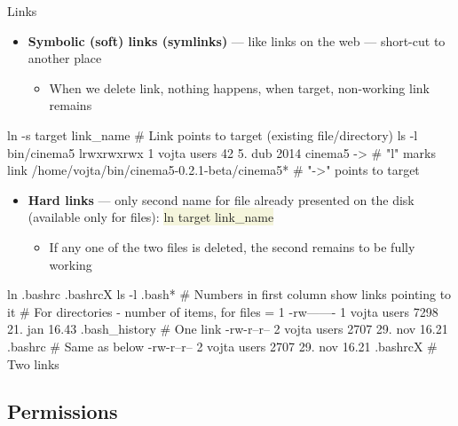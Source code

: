 \documentclass[compress, xelatex, 11pt, xcolor=svgnames, aspectratio=169,
	hyperref={
		bookmarks=true,
		unicode=true,
		colorlinks=true,
		pdftitle={Linux, command line and MetaCentrum},
		plainpages=false,
		pdfauthor={Vojtech Zeisek},
		pdfsubject={Course about use of Linux command line, writing shell scripts and using MetaCentrum of CESNET},
		pdfcreator={XeLaTeX},
		pdfkeywords={Linux, GNU, BASH, shell, command line, MetaCentrum},
		linkcolor=DarkRed, %
		anchorcolor=DarkBlue, %
		citecolor=Indigo, %
		filecolor=NavyBlue, %
		menucolor=DarkMagenta, %
		urlcolor=DarkBlue, %
		},
	url={hyphens, lowtilde} %
	]{beamer}
\renewcommand{\texttt}[1]{\colorbox{Beige}{{\ttfamily #1}}}
\begin{document}
\begin{frame}[fragile]{Links}
	\label{links}
	\begin{itemize}
		\item \textbf{Symbolic (soft) links (symlinks)} --- like links on the web --- short-cut to another place
		\begin{itemize}
			\item When we delete link, nothing happens, when target, non-working link remains
		\end{itemize}
	\end{itemize}
	\vfill
	\begin{bashcode}
    ln -s target link_name # Link points to target (existing file/directory)
    ls -l bin/cinema5
    lrwxrwxrwx 1 vojta users 42 5. dub 2014 cinema5 -> # "l" marks link
      /home/vojta/bin/cinema5-0.2.1-beta/cinema5*      # "->" points to target
	\end{bashcode}
	\vfill
	\begin{itemize}
		\item \textbf{Hard links} --- only second name for file already presented on the disk (available only for files): \texttt{ln target link\_name}
		\begin{itemize}
			\item If any one of the two files is deleted, the second remains to be fully working
		\end{itemize}
	\end{itemize}
	\vfill
	\begin{bashcode}
    ln .bashrc .bashrcX
    ls -l .bash* # Numbers in first column show links pointing to it
                 # For directories - number of items, for files = 1
    -rw------- 1 vojta users 7298 21. jan 16.43 .bash_history # One link
    -rw-r--r-- 2 vojta users 2707 29. nov 16.21 .bashrc       # Same as below
    -rw-r--r-- 2 vojta users 2707 29. nov 16.21 .bashrcX      # Two links
	\end{bashcode}
\end{frame}

\subsection{Permissions}
\end{document}
